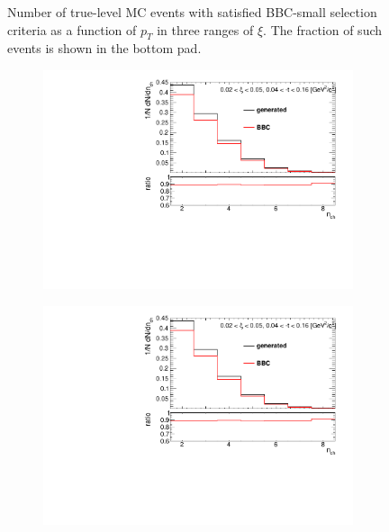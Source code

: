 \begin{figure}[h!]
\begin{subfigure}{.45\textwidth}
	\end{subfigure}
	\begin{minipage}{.45\textwidth}
		\caption[Number of true-level MC events with satisfied BBC-small selection criteria  as a function of $p_T$ in three ranges of $\xi$]{Number of true-level MC events with satisfied BBC-small selection criteria  as a function of $p_T$ in three ranges of $\xi$. The fraction of such events is shown in the bottom pad.}
		\label{fig:bbcCorection_pt}
	\end{minipage}
	
\end{figure}

\begin{figure}[h!]
	\centering
	\begin{subfigure}{.45\textwidth}
		\includegraphics[width=\textwidth,page=9]{chapters/chrgSTAR/img/bbcCorrection/xi_bbc.pdf}
	\end{subfigure}
	\begin{subfigure}{.45\textwidth}
		\includegraphics[width=\textwidth,page=10]{chapters/chrgSTAR/img/bbcCorrection/xi_bbc.pdf}

\end{subfigure}
\end{figure}
